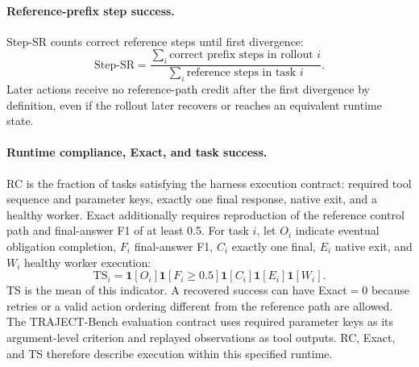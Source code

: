 \documentclass{article}
\begin{document}
\paragraph{Reference-prefix step success.}
Step-SR counts correct reference steps until first divergence:
\begin{equation}
\mathrm{Step\mbox{-}SR}=
\frac{\sum_i \text{correct prefix steps in rollout }i}
{\sum_i \text{reference steps in task }i}.
\end{equation}
Later actions receive no reference-path credit after the first divergence
by definition, even if the rollout later recovers or reaches an equivalent
runtime state.

\paragraph{Runtime compliance, Exact, and task success.}
RC is the fraction of tasks satisfying the harness execution contract: required
tool sequence and parameter keys, exactly one final response, native exit, and
a healthy worker. Exact additionally requires reproduction of the reference
control path and final-answer F1 of at least 0.5. For task $i$, let $O_i$
indicate eventual obligation completion, $F_i$ final-answer F1, $C_i$ exactly
one final, $E_i$ native exit, and $W_i$ healthy worker execution:
\begin{equation}
\mathrm{TS}_i=\mathbf 1[O_i]\mathbf 1[F_i\geq0.5]
\mathbf 1[C_i]\mathbf 1[E_i]\mathbf 1[W_i].
\end{equation}
TS is the mean of this indicator. A recovered success can have Exact$=0$
because retries or a valid action ordering different from the reference path
are allowed. The TRAJECT-Bench evaluation contract uses required parameter keys as its
argument-level criterion and replayed observations as tool outputs. RC, Exact, and TS
therefore describe execution within this specified runtime.
\end{document}
